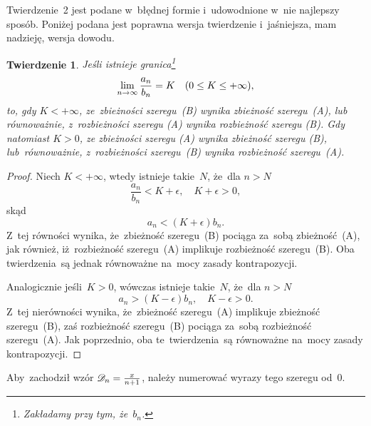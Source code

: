 \documentclass[a4paper,11pt]{article}
\newtheorem{twr}{Twierdzenie}  %
\begin{document}
\start {} Twierdzenie~2 jest podane w~błędnej formie
i~udowodnione w~nie najlepszy sposób. Poniżej podana jest poprawna
wersja twierdzenie i~jaśniejsza, mam nadzieję, wersja dowodu.
\begin{twr}
  \label{thm:FichtenholzVolII-02}
  Jeśli istnieje granica\footnote{Zakładamy przy tym, że~$b_{ n }$.}
  \begin{equation}
    \label{eq:FichtenholzVolII-12}
    \lim\limits_{ n \to \infty } \frac{ a_{ n } }{ b_{ n } } = K
    \quad ( 0 \leq K \leq +\infty ),
  \end{equation}
  to, gdy $K < +\infty$, ze~zbieżności szeregu~(B) wynika zbieżność
  szeregu~(A), lub równoważnie, z~rozbieżności szeregu (A) wynika
  rozbieżność szeregu (B). Gdy natomiast $K > 0$, ze zbieżności
  szeregu (A) wynika zbieżność szeregu (B), lub~równoważnie,
  z~rozbieżności szeregu~(B) wynika rozbieżność szeregu~(A).
\end{twr}
\begin{proof}
  Niech $K < +\infty$, wtedy istnieje takie~$N$, że~dla $n > N$
  \begin{equation}
    \label{eq:FichtenholzVolII-13}
    \frac{ a_{ n } }{ b_{ n } } < K + \epsilon,
    \quad K + \epsilon > 0,
  \end{equation}
  skąd
  \begin{equation}
    \label{eq:FichtenholzVolII-14}
    a_{ n } < ( K + \epsilon ) b_{ n }.
  \end{equation}
  Z~tej równości wynika, że~zbieżność szeregu~(B) pociąga za~sobą
  zbieżność~(A), jak również, iż~rozbieżność szeregu~(A) implikuje
  rozbieżność szeregu~(B). Oba twierdzenia~są jednak równoważne
  na~mocy zasady kontrapozycji.

  Analogicznie jeśli~$K > 0$, wówczas istnieje takie~$N$, że~dla
  $n > N$
  \begin{equation}
    \label{eq:FichtenholzVolII-15}
    a_{ n } > ( K - \epsilon ) b_{ n },
    \quad K - \epsilon > 0.
  \end{equation}
  Z~tej nierówności wynika, że~zbieżność szeregu~(A) implikuje
  zbieżność szeregu~(B), zaś rozbieżność szeregu~(B) pociąga za~sobą
  rozbieżność szeregu~(A). Jak poprzednio, oba te~twierdzenia~są
  równoważne na~mocy zasady kontrapozycji.
\end{proof}

\vspace{\spaceFour}


\start {} Aby~zachodził wzór
$\mathcal{D}_{ n } = \tfrac{ x }{ n + 1 }$, należy numerować wyrazy tego
szeregu od~0.
\end{document}
